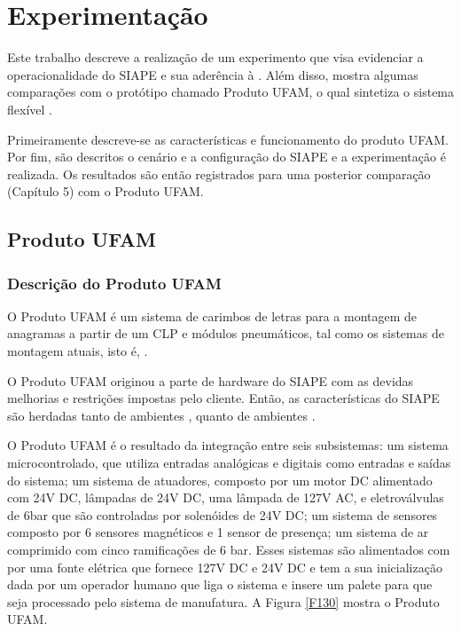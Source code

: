 \chapter{Experimentação}
\label{cap:estudo_de_caso}

Este trabalho descreve a realização de um experimento que visa evidenciar a operacionalidade do SIAPE e sua aderência à \iQuatroZero. Além disso, mostra algumas comparações com o protótipo chamado Produto UFAM, o qual sintetiza o sistema flexível \iTresZero.

Primeiramente descreve-se as características e funcionamento do produto UFAM. Por fim, são descritos o cenário e a configuração do SIAPE e a experimentação é realizada. Os resultados são então registrados para uma posterior comparação (Capítulo 5) com o Produto UFAM.



\section{Produto UFAM}	

\subsection{Descrição do Produto UFAM}

O Produto UFAM é um sistema de carimbos de letras para a montagem de anagramas a partir de um CLP e módulos pneumáticos, tal como os sistemas de montagem atuais, isto é, \iTresZero.

O Produto UFAM originou a parte de hardware do SIAPE com as devidas melhorias e restrições impostas pelo cliente. Então, as características do SIAPE são herdadas tanto de ambientes \iTresZero, quanto de ambientes \iQuatroZero.
	 
O Produto UFAM é o resultado da integração entre seis subsistemas: um sistema microcontrolado, que utiliza entradas analógicas e digitais como entradas e saídas do sistema; um sistema de atuadores, composto por um motor DC alimentado com 24V DC, lâmpadas de 24V DC, uma lâmpada de 127V AC, e eletroválvulas de 6bar que são controladas por solenóides de 24V DC; um sistema de sensores composto por 6 sensores magnéticos e 1 sensor de presença; um sistema de ar comprimido com cinco ramificações de 6 bar. Esses sistemas são alimentados com por uma fonte elétrica que fornece 127V DC e 24V DC e tem a sua inicialização dada por um operador humano que liga o sistema e insere um palete para que seja processado pelo sistema de manufatura. A Figura \ref{F130} mostra o Produto UFAM.
	 
